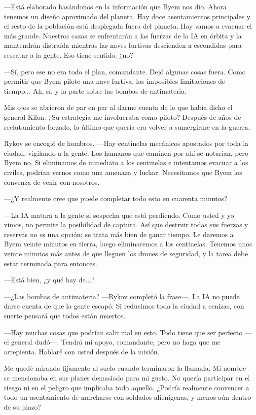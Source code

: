 —Está elaborado basándonos en la información que Byem nos dio. Ahora tenemos un diseño aproximado del planeta. Hay doce asentamientos principales y el resto de la población está desplegada fuera del planeta. Hoy vamos a evacuar el más grande. Nuestros cazas se enfrentarán a las fuerzas de la IA en órbita y la mantendrán distraída mientras las naves furtivas descienden a escondidas para rescatar a la gente. Eso tiene sentido, ¿no?

—Sí, pero ese no era todo el plan, comandante. Dejó algunas cosas fuera. Como permitir que Byem pilote una nave furtiva, las imposibles limitaciones de tiempo... Ah, sí, y la parte sobre las bombas de antimateria.

Mis ojos se abrieron de par en par al darme cuenta de lo que había dicho el general Kilon. ¿Su estrategia me involucraba como piloto? Después de años de reclutamiento forzado, lo último que quería era volver a sumergirme en la guerra.

Rykov se encogió de hombros. —Hay centinelas mecánicos apostados por toda la ciudad, vigilando a la gente. Los humanos que caminen por ahí se notarían, pero Byem no. Si eliminamos de inmediato a los centinelas e intentamos evacuar a los civiles, podrían vernos como una amenaza y luchar. Necesitamos que Byem los convenza de venir con nosotros.

 —¿Y realmente cree que puede completar todo esto en cuarenta minutos?

—La IA matará a la gente si sospecha que está perdiendo. Como usted y yo vimos, no permite la posibilidad de captura. Así que destruir todas sus fuerzas y reservas no es una opción; se trata más bien de ganar tiempo. Le daremos a Byem veinte minutos en tierra, luego eliminaremos a los centinelas. Tenemos unos veinte minutos más antes de que lleguen los drones de seguridad, y la tarea debe estar terminada para entonces.

—Está bien, ¿y qué hay de...?

—¿Las bombas de antimateria? —Rykov completó la frase—. La IA no puede darse cuenta de que la gente escapó. Si reducimos toda la ciudad a cenizas, con suerte pensará que todos están muertos.

—Hay muchas cosas que podrían salir mal en esto. Todo tiene que ser perfecto —el general dudó—. Tendrá mi apoyo, comandante, pero no haga que me arrepienta. Hablaré con usted después de la misión.

Me quedé mirando fijamente al suelo cuando terminaron la llamada. Mi nombre se mencionaba en sus planes demasiado para mi gusto. No quería participar en el riesgo ni en el peligro que implicaba todo aquello. ¿Podría realmente convencer a todo un asentamiento de marcharse con soldados alienígenas, y menos aún dentro de su plazo?

